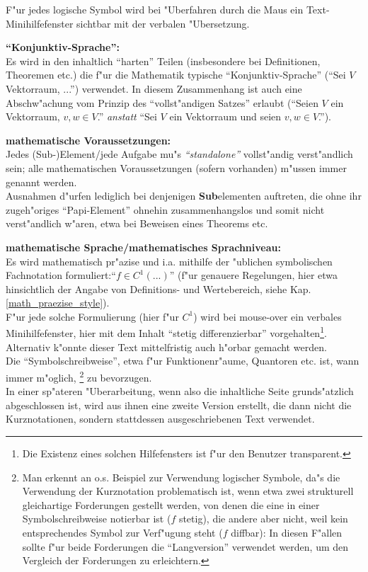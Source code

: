 \begin{list_sabina}
F"ur jedes logische Symbol wird bei "Uberfahren durch die Maus ein
Text-Minihilfefenster sichtbar mit der verbalen "Ubersetzung.

\item
\textbf{``Konjunktiv-Sprache'':}\\
Es wird in den inhaltlich ``harten'' Teilen (insbesondere bei Definitionen,
Theoremen etc.)  die f"ur die Mathematik typische
``Konjunktiv-Sprache'' (``Sei $V$ Vektorraum, ...'') verwendet. In diesem Zusammenhang
ist auch eine Abschw"achung vom Prinzip des ``vollst"andigen Satzes'' erlaubt
(``Seien $V$ ein Vektorraum, $v,w\in V$.'' \emph{anstatt} ``Sei $V$ ein Vektorraum und seien
$v,w\in V$.'').

\item
\textbf{mathematische Voraussetzungen:}\\
Jedes (Sub-)Element/jede Aufgabe mu"s \emph{``standalone''} vollst"andig
verst"andlich sein; alle mathematischen Voraussetzungen 
(sofern vorhanden) m"ussen immer genannt werden.\\
Ausnahmen d"urfen lediglich bei denjenigen \textbf{Sub}elementen
auftreten, die ohne ihr zugeh"origes ``Papi-Element'' ohnehin
zusammenhangslos und somit nicht verst"andlich w"aren, 
etwa bei Beweisen eines Theorems etc.

\item \textbf{mathematische Sprache/mathematisches Sprachniveau:}\\ 
Es wird mathematisch pr"azise und i.a. mithilfe der "ublichen
symbolischen Fachnotation formuliert:``$f \in C^{1}(...)$'' 
(f"ur genauere Regelungen, hier etwa hinsichtlich der Angabe von
Definitions- und Wertebereich, siehe Kap. \ref{math_praezise_style}). \\
F"ur jede solche Formulierung (hier f"ur $C^{1}$) wird bei mouse-over ein verbales
Minihilfefenster, hier mit dem Inhalt ``stetig differenzierbar''
vorgehalten\footnote{Die Existenz
eines solchen Hilfefensters ist f"ur den Benutzer
transparent.}. Alternativ k"onnte dieser Text mittelfristig auch
h"orbar gemacht werden.\\
Die ``Symbolschreibweise'', etwa f"ur Funktionenr"aume, Quantoren etc.
ist, wann immer m"oglich, \footnote{Man erkennt an o.s. Beispiel zur
Verwendung logischer Symbole, da"s die Verwendung der Kurznotation
problematisch ist, wenn etwa zwei strukturell gleichartige Forderungen
gestellt werden, von denen die eine in einer Symbolschreibweise
notierbar ist ($f$ stetig), die andere aber nicht, weil kein
entsprechendes Symbol zur Verf"ugung steht ($f$ diffbar): In diesen
F"allen sollte f"ur beide Forderungen die ``Langversion'' verwendet
werden, um den Vergleich der Forderungen zu erleichtern.} zu
bevorzugen.\\
In einer sp"ateren "Uberarbeitung, wenn also die inhaltliche Seite
grunds"atzlich abgeschlossen ist, wird aus ihnen eine zweite
Version erstellt, die dann nicht die Kurznotationen, sondern
stattdessen ausgeschriebenen Text verwendet.


\end{list_sabina}
